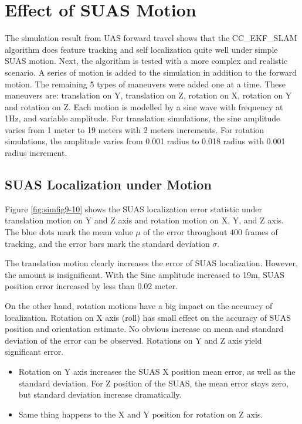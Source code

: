 \section{Effect of SUAS Motion}
The simulation result from UAS forward travel shows that the CC\_EKF\_SLAM algorithm does feature tracking and self localization quite well under simple SUAS motion. Next, the algorithm is tested with a more complex and realistic scenario. A series of motion is added to the simulation in addition to the forward motion. The remaining 5 types of maneuvers were added one at a time. These maneuvers are: translation on Y, translation on Z, rotation on X, rotation on Y and rotation on Z. Each motion is modelled by a sine wave with frequency at 1Hz, and variable amplitude. For translation simulations, the sine amplitude varies from 1 meter to 19 meters with 2 meters increments. For rotation simulations, the amplitude varies from 0.001 radius to 0.018 radius with 0.001 radius increment.

\subsection{SUAS Localization under Motion}

Figure \ref{fig:simfig9-10} shows the SUAS localization error statistic under translation motion on Y and Z axis and rotation motion on X, Y, and Z axis. The blue dots mark the mean value $\mu$ of the error throughout 400 frames of tracking, and the error bars mark the standard deviation $\sigma$.

The translation motion clearly increases the error of SUAS localization. However, the amount is insignificant. With the Sine amplitude increased to 19m, SUAS position error increased by less than 0.02 meter.

On the other hand, rotation motions have a big impact on the accuracy
of localization. Rotation on X axis (roll) has small effect on the accuracy of SUAS position and orientation estimate. No obvious increase on mean and standard deviation of the error can be observed. Rotations on Y and Z axis yield significant error.

\begin{itemize}
  \item Rotation on Y axis increases the SUAS X position mean error, as well as the standard deviation. For Z position of the SUAS, the mean error stays zero, but standard deviation increase dramatically.
  \item Same thing happens to the X and Y position for rotation on Z axis.
\end{itemize}

